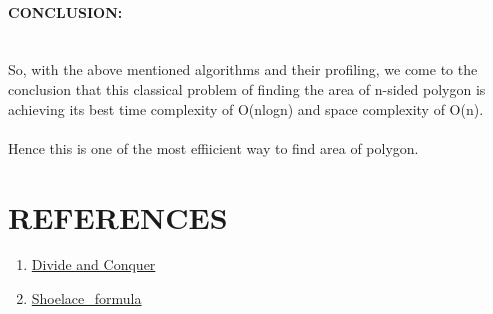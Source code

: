 \documentclass[10pt]{article}
\begin{document}
\begin{multicols*}{2}
\paragraph{CONCLUSION:} \\


So, with the above mentioned algorithms and their profiling, we come to the conclusion that this classical problem of finding the  area of n-sided polygon is achieving its best time complexity of O(nlogn) and space complexity of O(n).\\\\ Hence this is one of the most effiicient way to find area of polygon.

\section*{REFERENCES}


\begin{enumerate}
    
\item  \href{https://www.geeksforgeeks.org/divide-and-conquer-algorithm-introduction/}{Divide and Conquer}
\item  \href{https://en.wikipedia.org/wiki/Shoelace_formula}{Shoelace_formula}\\

\end{enumerate}\\

\end{multicols*}

\clearpage
\end{document}
